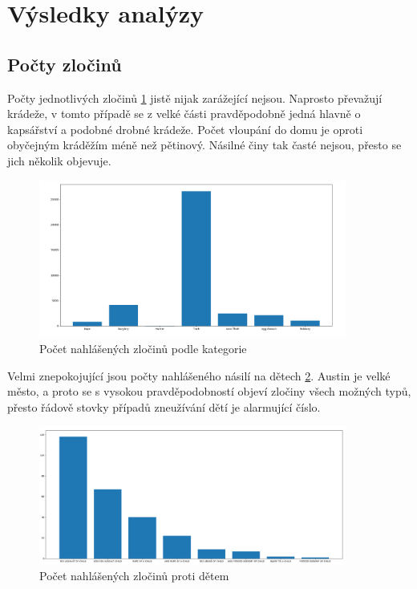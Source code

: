 \documentclass{article}
\begin{document}
\section{Výsledky analýzy}

\subsection{Počty zločinů}

Počty jednotlivých zločinů \ref{fig:crime_counts} jistě nijak zarážející nejsou. Naprosto
převažují krádeže, v tomto případě se z velké části pravděpodobně jedná hlavně o kapsářství
a podobné drobné krádeže. Počet vloupání do domu je oproti obyčejným kráděžím méně
než pětinový. Násilné činy tak časté nejsou, přesto se jich několik objevuje.

\begin{figure}
  \centering
  \includegraphics[width=0.9\textwidth]{figures/crime_counts.png}
  \caption{Počet nahlášených zločinů podle kategorie}
  \label{fig:crime_counts}
\end{figure}

Velmi znepokojující jsou počty nahlášeného násilí na dětech \ref{fig:crime_against_children}.
Austin je velké město, a proto se s vysokou pravděpodobností objeví zločiny všech možných typů,
přesto řádově stovky případů zneužívání dětí je alarmující číslo.

\begin{figure}
  \centering
  \includegraphics[width=0.9\textwidth]{figures/crime_against_children.png}
  \caption{Počet nahlášených zločinů proti dětem}
  \label{fig:crime_against_children}
\end{figure}
\end{document}

